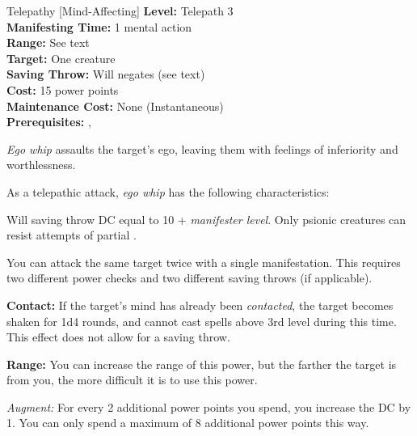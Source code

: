 {Telepathy [Mind-Affecting]}
{
	\textbf{Level:}
	Telepath 3\\
	\textbf{Manifesting Time:}
	1 mental action\\
	\textbf{Range:}
	See text\\
	\textbf{Target:}
	One creature\\
	\textbf{Saving Throw:}
	Will negates (see text)\\
	\textbf{Cost:}
	15 power points\\
	\textbf{Maintenance Cost:}
	None (Instantaneous)\\
	\textbf{Prerequisites:}
	, \\
}
{
	\emph{Ego whip} assaults the target's ego, leaving them with feelings of inferiority and worthlessness.

	As a telepathic attack, \emph{ego whip} has the following characteristics:
	\begin{itemize*}
		\item Will saving throw DC equal to 10 + \textit{manifester level}. Only psionic creatures can resist attempts of partial .
		\item You can attack the same target twice with a single manifestation. This requires two different power checks and two different saving throws (if applicable).
	\end{itemize*}

	\textbf{Contact:} If the target's mind has already been \emph{contacted}, the target becomes shaken for 1d4 rounds, and cannot cast spells above 3rd level during this time. This effect does not allow for a saving throw.
	
	\textbf{Range:} You can increase the range of this power, but the farther the target is from you, the more difficult it is to use this power.


	\textit{Augment:} For every 2 additional power points you spend, you increase the DC by 1. You can only spend a maximum of 8 additional power points this way.
}
